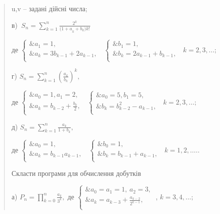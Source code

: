 \documentclass[]{article}
\begin{document}
\begin{quote}
u,v -- задані дійсні числа;

в)
\(\ S_{n} = \sum_{k = 1}^{n}\frac{2^{k}}{{(1 + a}_{k} + b_{k}){k!}^{}}\)

де \(\left\{ \begin{matrix}
\& a_{1} = 1, \\
\& a_{k} = 3b_{k - 1} + 2a_{k - 1}, \\
\end{matrix} \right.\ \) \(\left\{ \begin{matrix}
\& b_{1} = 1, \\
\& b_{k} = 2a_{k - 1} + b_{k - 1}, \\
\end{matrix} \right.\ \) \(k = 2,3,\ldots;\)

г) \(S_{n} = \sum_{k = 1}^{n}\left( \frac{a_{k}}{b_{k}} \right)^{k},\)

де \(\left\{ \begin{matrix}
\& a_{0} = 1,a_{1} = 2, \\
\& a_{k} = b_{k - 2} + \frac{b_{k}}{2}, \\
\end{matrix} \right.\ \) \(\left\{ \begin{matrix}
\& a_{0} = 5,b_{1} = 5, \\
\& b_{k} = b_{k - 2}^{2} - a_{k - 1}, \\
\end{matrix} \right.\ \) \(k = 2,3,\ldots;\)

д) \(S_{n} = \sum_{k = 1}^{n}\frac{a_{k}}{1 + b_{k}},\)

де \(\left\{ \begin{matrix}
\& a_{0} = 1, \\
\& a_{k} = b_{k - 1}a_{k - 1}, \\
\end{matrix} \right.\ \) \(\left\{ \begin{matrix}
\& b_{0} = 1, \\
\& b_{k} = b_{k - 1} + a_{k - 1}, \\
\end{matrix} \right.\ \) \(k = 1,2,\ldots.\).

Скласти програми для обчислення добутків

а) \(P_{n} = \prod_{k = 0}^{n}{\frac{a_{k}}{3^{k}},}\) де
\(\left\{ \begin{matrix}
\& a_{0} = a_{1} = 1,\ a_{2} = 3, \\
\& a_{k} = a_{k - 3} + \frac{a_{k - 2}}{2^{k - 1}}, \\
\end{matrix} \right.\ \), \(k = 3,4,\ldots;\)


\end{quote}
\end{document}
